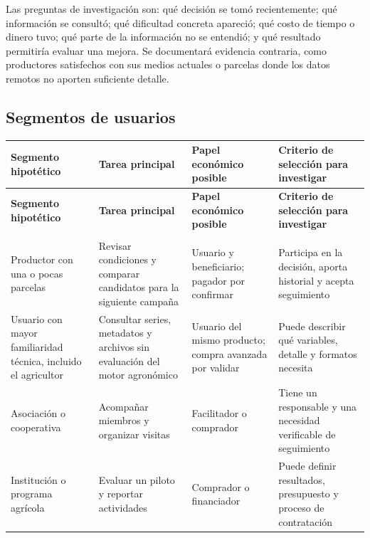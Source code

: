 \documentclass[10pt,a4paper]{article}
\begin{document}
Las preguntas de investigación son: qué decisión se tomó recientemente; qué información se consultó; qué dificultad concreta apareció; qué costo de tiempo o dinero tuvo; qué parte de la información no se entendió; y qué resultado permitiría evaluar una mejora. Se documentará evidencia contraria, como productores satisfechos con sus medios actuales o parcelas donde los datos remotos no aporten suficiente detalle.


\subsection{Segmentos de usuarios}

\begingroup\small
\begin{longtable}{>{\raggedright\arraybackslash}p{3.115cm}>{\raggedright\arraybackslash}p{3.582cm}>{\raggedright\arraybackslash}p{4.517cm}>{\raggedright\arraybackslash}p{4.361cm}}
\toprule
\textbf{Segmento hipotético} & \textbf{Tarea principal} & \textbf{Papel económico posible} & \textbf{Criterio de selección para investigar} \\
\midrule\endfirsthead
\toprule
\textbf{Segmento hipotético} & \textbf{Tarea principal} & \textbf{Papel económico posible} & \textbf{Criterio de selección para investigar} \\
\midrule\endhead
\midrule\multicolumn{4}{r}{\scriptsize Continúa en la página siguiente}\\\endfoot
\bottomrule\endlastfoot
Productor con una o pocas parcelas & Revisar condiciones y comparar candidatos para la siguiente campaña & Usuario y beneficiario; pagador por confirmar & Participa en la decisión, aporta historial y acepta seguimiento \\[3pt]
Usuario con mayor familiaridad técnica, incluido el agricultor & Consultar series, metadatos y archivos sin evaluación del motor agronómico & Usuario del mismo producto; compra avanzada por validar & Puede describir qué variables, detalle y formatos necesita \\[3pt]
Asociación o cooperativa & Acompañar miembros y organizar visitas & Facilitador o comprador & Tiene un responsable y una necesidad verificable de seguimiento \\[3pt]
Institución o programa agrícola & Evaluar un piloto y reportar actividades & Comprador o financiador & Puede definir resultados, presupuesto y proceso de contratación \\[3pt]
\end{longtable}
\endgroup
\end{document}
